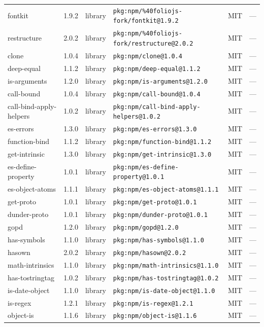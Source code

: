 \documentclass[11pt]{article}
\begin{document}
\begin{longtable}{|l|l|l|p{2.2cm}|l|p{4cm}|}
fontkit & 1.9.2 & library & \texttt{pkg:npm/\%40foliojs-fork/fontkit@1.9.2} & MIT & — \\
restructure & 2.0.2 & library & \texttt{pkg:npm/\%40foliojs-fork/restructure@2.0.2} & MIT & — \\
clone & 1.0.4 & library & \texttt{pkg:npm/clone@1.0.4} & MIT & — \\
deep-equal & 1.1.2 & library & \texttt{pkg:npm/deep-equal@1.1.2} & MIT & — \\
is-arguments & 1.2.0 & library & \texttt{pkg:npm/is-arguments@1.2.0} & MIT & — \\
call-bound & 1.0.4 & library & \texttt{pkg:npm/call-bound@1.0.4} & MIT & — \\
call-bind-apply-helpers & 1.0.2 & library & \texttt{pkg:npm/call-bind-apply-helpers@1.0.2} & MIT & — \\
es-errors & 1.3.0 & library & \texttt{pkg:npm/es-errors@1.3.0} & MIT & — \\
function-bind & 1.1.2 & library & \texttt{pkg:npm/function-bind@1.1.2} & MIT & — \\
get-intrinsic & 1.3.0 & library & \texttt{pkg:npm/get-intrinsic@1.3.0} & MIT & — \\
es-define-property & 1.0.1 & library & \texttt{pkg:npm/es-define-property@1.0.1} & MIT & — \\
es-object-atoms & 1.1.1 & library & \texttt{pkg:npm/es-object-atoms@1.1.1} & MIT & — \\
get-proto & 1.0.1 & library & \texttt{pkg:npm/get-proto@1.0.1} & MIT & — \\
dunder-proto & 1.0.1 & library & \texttt{pkg:npm/dunder-proto@1.0.1} & MIT & — \\
gopd & 1.2.0 & library & \texttt{pkg:npm/gopd@1.2.0} & MIT & — \\
has-symbols & 1.1.0 & library & \texttt{pkg:npm/has-symbols@1.1.0} & MIT & — \\
hasown & 2.0.2 & library & \texttt{pkg:npm/hasown@2.0.2} & MIT & — \\
math-intrinsics & 1.1.0 & library & \texttt{pkg:npm/math-intrinsics@1.1.0} & MIT & — \\
has-tostringtag & 1.0.2 & library & \texttt{pkg:npm/has-tostringtag@1.0.2} & MIT & — \\
is-date-object & 1.1.0 & library & \texttt{pkg:npm/is-date-object@1.1.0} & MIT & — \\
is-regex & 1.2.1 & library & \texttt{pkg:npm/is-regex@1.2.1} & MIT & — \\
object-is & 1.1.6 & library & \texttt{pkg:npm/object-is@1.1.6} & MIT & — \\

\end{longtable}
\end{document}
